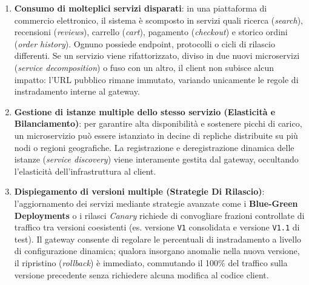 \documentclass[11pt, a4paper]{article}
\begin{document}
\begin{enumerate}
    \item \textbf{Consumo di molteplici servizi disparati}: in una piattaforma di commercio elettronico, il sistema è scomposto in servizi quali ricerca (\emph{search}), recensioni (\emph{reviews}), carrello (\emph{cart}), pagamento (\emph{checkout}) e storico ordini (\emph{order history}). Ognuno possiede endpoint, protocolli o cicli di rilascio differenti. Se un servizio viene rifattorizzato, diviso in due nuovi microservizi (\emph{service decomposition}) o fuso con un altro, il client non subisce alcun impatto: l'URL pubblico rimane immutato, variando unicamente le regole di instradamento interne al gateway.


    \item \textbf{Gestione di istanze multiple dello stesso servizio (Elasticità e Bilanciamento)}: per garantire alta disponibilità e sostenere picchi di carico, un microservizio può essere istanziato in decine di repliche distribuite su più nodi o regioni geografiche. La registrazione e deregistrazione dinamica delle istanze (\emph{service discovery}) viene interamente gestita dal gateway, occultando l'elasticità dell'infrastruttura al client.


    \item \textbf{Dispiegamento di versioni multiple (Strategie Di Rilascio)}: l'aggiornamento dei servizi mediante strategie avanzate come i \textbf{Blue-Green Deployments} o i rilasci \emph{Canary} richiede di convogliare frazioni controllate di traffico tra versioni coesistenti (es. versione \texttt{V1} consolidata e versione \texttt{V1.1} di test). Il gateway consente di regolare le percentuali di instradamento a livello di configurazione dinamica; qualora insorgano anomalie nella nuova versione, il ripristino (\emph{rollback}) è immediato, commutando il 100\% del traffico sulla versione precedente senza richiedere alcuna modifica al codice client.

\end{enumerate}
\end{document}

